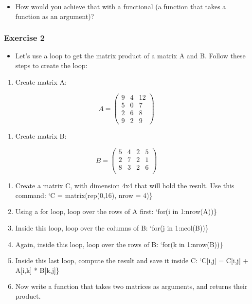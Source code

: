 \documentclass[]{gitbook}
\providecommand{\tightlist}{%
  \setlength{\itemsep}{0pt}\setlength{\parskip}{0pt}}
\begin{document}
\begin{itemize}
\tightlist
\item
  How would you achieve that with a functional (a function that takes a function as an argument)?
\end{itemize}

\hypertarget{exercise-2-3}{%
\subsubsection*{Exercise 2}\label{exercise-2-3}}

\begin{itemize}
\tightlist
\item
  Let's use a loop to get the matrix product of a matrix A and B. Follow these steps to create the loop:
\end{itemize}

\begin{enumerate}
\def\labelenumi{\arabic{enumi})}
\tightlist
\item
  Create matrix A:
\end{enumerate}

\[A = \left(
  \begin{array}{ccc}
   9 & 4 & 12 \\
   5 & 0 & 7 \\
   2 & 6 & 8 \\
   9 & 2 & 9
  \end{array} \right)
\]

\begin{enumerate}
\def\labelenumi{\arabic{enumi})}
\setcounter{enumi}{1}
\tightlist
\item
  Create matrix B:
\end{enumerate}

\[B = \left(
\begin{array}{cccc}
 5 & 4 & 2 & 5 \\
 2 & 7 & 2 & 1 \\
 8 & 3 & 2 & 6 \\
\end{array} \right)
\]

\begin{enumerate}
\def\labelenumi{\arabic{enumi})}
\setcounter{enumi}{2}
\item
  Create a matrix C, with dimension 4x4 that will hold the result. Use this command: `C = matrix(rep(0,16), nrow = 4)\}
\item
  Using a for loop, loop over the rows of A first: `for(i in 1:nrow(A))\}
\item
  Inside this loop, loop over the columns of B: `for(j in 1:ncol(B))\}
\item
  Again, inside this loop, loop over the rows of B: `for(k in 1:nrow(B))\}
\item
  Inside this last loop, compute the result and save it inside C: `C{[}i,j{]} = C{[}i,j{]} + A{[}i,k{]} * B{[}k,j{]}\}
\item
  Now write a function that takes two matrices as arguments, and returns their product.
\end{enumerate}
\end{document}
